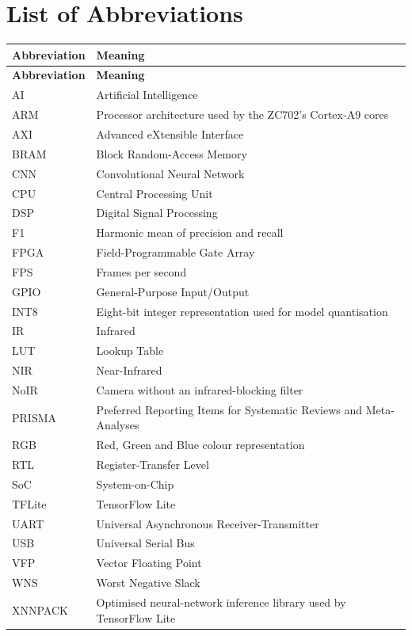 
\chapter*{List of Abbreviations}

\renewcommand{\arraystretch}{1.25}

\begin{longtable}{@{}p{}p{}@{}}
\toprule
\textbf{Abbreviation} & \textbf{Meaning} \\
\midrule
\endfirsthead

\toprule
\textbf{Abbreviation} & \textbf{Meaning} \\
\midrule
\endhead

AI       & Artificial Intelligence \\
ARM      & Processor architecture used by the ZC702's Cortex-A9 cores \\
AXI      & Advanced eXtensible Interface \\
BRAM     & Block Random-Access Memory \\
CNN      & Convolutional Neural Network \\
CPU      & Central Processing Unit \\
DSP      & Digital Signal Processing \\
F1       & Harmonic mean of precision and recall \\
FPGA     & Field-Programmable Gate Array \\
FPS      & Frames per second \\
GPIO     & General-Purpose Input/Output \\
INT8     & Eight-bit integer representation used for model quantisation \\
IR       & Infrared \\
LUT      & Lookup Table \\
NIR      & Near-Infrared \\
NoIR     & Camera without an infrared-blocking filter \\
PRISMA   & Preferred Reporting Items for Systematic Reviews and Meta-Analyses \\
RGB      & Red, Green and Blue colour representation \\
RTL      & Register-Transfer Level \\
SoC      & System-on-Chip \\
TFLite   & TensorFlow Lite \\
UART     & Universal Asynchronous Receiver-Transmitter \\
USB      & Universal Serial Bus \\
VFP      & Vector Floating Point \\
WNS      & Worst Negative Slack \\
XNNPACK  & Optimised neural-network inference library used by TensorFlow Lite \\

\bottomrule
\end{longtable}

\renewcommand{\arraystretch}{1}